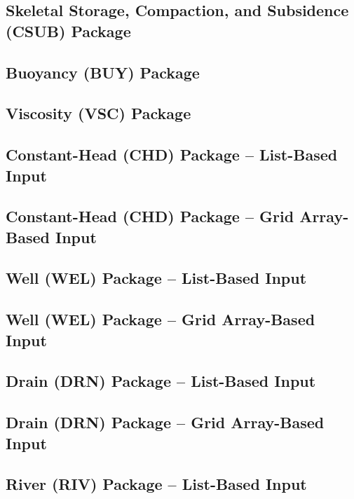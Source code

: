 \newpage
\subsection{Skeletal Storage, Compaction, and Subsidence (CSUB) Package}


\newpage
\subsection{Buoyancy (BUY) Package}


\newpage
\subsection{Viscosity (VSC) Package}


\newpage
\subsection{Constant-Head (CHD) Package -- List-Based Input}


\newpage
\subsection{Constant-Head (CHD) Package -- Grid Array-Based Input}


\newpage
\subsection{Well (WEL) Package -- List-Based Input}


\newpage
\subsection{Well (WEL) Package -- Grid Array-Based Input}


\newpage
\subsection{Drain (DRN) Package -- List-Based Input}


\newpage
\subsection{Drain (DRN) Package -- Grid Array-Based Input}


\newpage
\subsection{River (RIV) Package -- List-Based Input}


